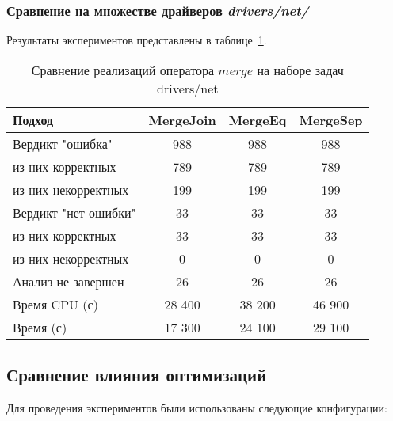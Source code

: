\subsubsection{Сравнение на множестве драйверов \textit{drivers/net/} }

Результаты экспериментов представлены в таблице~\ref{table-drivers-merge}.

\begin{center}
  \begin{table}[h]\footnotesize
  	\label{table-drivers-merge}
    \caption{Сравнение реализаций оператора $merge$ на наборе задач drivers/net}
    \begin{tabular}{ | l | c | c | c | }
      \hline
      Подход         				& MergeJoin	& MergeEq 	& MergeSep   \\ \hline
      Вердикт "ошибка" 				& 988    	& 988  		& 988         \\ 
  \hspace{0.5cm} из них корректных 	& 789 		& 789 		& 789      \\ 
  \hspace{0.5cm} из них некорректных & 199 		& 199 		& 199        \\ \hline
      Вердикт "нет ошибки"  		& 33      	& 33        & 33       \\ 
  \hspace{0.5cm} из них корректных 	& 33 		& 33    	& 33        \\
  \hspace{0.5cm} из них некорректных & 0 		& 0    		& 0         \\ \hline
      Анализ не завершен       		& 26     	& 26        & 26       \\ \hline
      Время CPU (с)   				& 28 400 	& 38 200    & 46 900    \\ 
      Время (с)  					& 17 300 	& 24 100    & 29 100     \\
      \hline
    \end{tabular}
  \end{table}
\end{center}

\subsection{Сравнение влияния оптимизаций}

Для проведения экспериментов были использованы следующие конфигурации:

